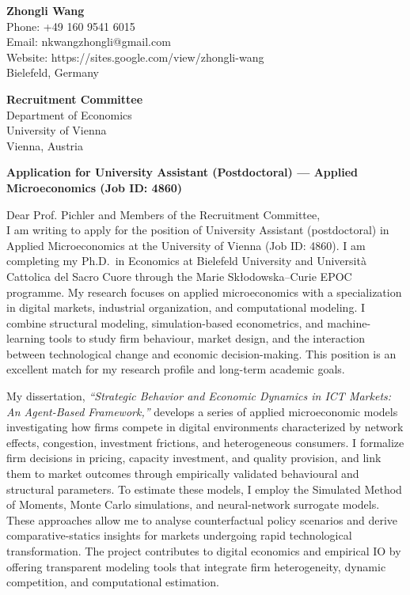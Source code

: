 \documentclass[11pt]{article}
\begin{document}
\noindent
\textbf{Zhongli Wang} \\
Phone: +49 160 9541 6015 \\
Email: nkwangzhongli@gmail.com \\
Website: https://sites.google.com/view/zhongli-wang \\
Bielefeld, Germany \\

\vspace{0.5cm}

\noindent
\textbf{Recruitment Committee} \\
Department of Economics \\
University of Vienna \\
Vienna, Austria \\

\vspace{0.5cm}

\noindent
\textbf{Application for University Assistant (Postdoctoral) — Applied Microeconomics (Job ID: 4860)} \\

\vspace{0.3cm}

\noindent Dear Prof. Pichler and Members of the Recruitment Committee,\\[0.2cm]

I am writing to apply for the position of University Assistant (postdoctoral) in Applied Microeconomics at the University of Vienna (Job ID: 4860). I am completing my Ph.D.\ in Economics at Bielefeld University and Università Cattolica del Sacro Cuore through the Marie Skłodowska–Curie EPOC programme. My research focuses on applied microeconomics with a specialization in digital markets, industrial organization, and computational modeling. I combine structural modeling, simulation-based econometrics, and machine-learning tools to study firm behaviour, market design, and the interaction between technological change and economic decision-making. This position is an excellent match for my research profile and long-term academic goals.

My dissertation, \textit{“Strategic Behavior and Economic Dynamics in ICT Markets: An Agent-Based Framework,”} develops a series of applied microeconomic models investigating how firms compete in digital environments characterized by network effects, congestion, investment frictions, and heterogeneous consumers. I formalize firm decisions in pricing, capacity investment, and quality provision, and link them to market outcomes through empirically validated behavioural and structural parameters. To estimate these models, I employ the Simulated Method of Moments, Monte Carlo simulations, and neural-network surrogate models. These approaches allow me to analyse counterfactual policy scenarios and derive comparative-statics insights for markets undergoing rapid technological transformation. The project contributes to digital economics and empirical IO by offering transparent modeling tools that integrate firm heterogeneity, dynamic competition, and computational estimation.
\end{document}
